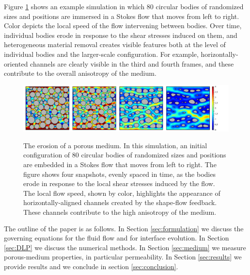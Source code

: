 \documentclass[3p]{elsarticle}
\begin{document}
	Figure \ref{fig1} shows an example simulation in which 80 circular bodies of randomized sizes and positions are immersed in a Stokes flow that moves from left to right. Color depicts the local speed of the flow intervening between bodies. Over time, individual bodies erode in response to the shear stresses induced on them, and heterogeneous material removal creates visible features both at the level of individual bodies and the larger-scale configuration. For example, horizontally-oriented channels are clearly visible in the third and fourth frames, and these contribute to the overall anisotropy of the medium.



\begin{figure}%
\centering \label{fig1}
\includegraphics[width = 0.99 \textwidth]{./figs/Velocity-80-4.pdf}
\caption{The erosion of a porous medium. In this simulation, an initial configuration of 80 circular bodies of randomized sizes and positions are embedded in a Stokes flow that moves from left to right. The figure shows four snapshots, evenly spaced in time, as the bodies erode in response to the local shear stresses induced by the flow. The local flow speed, shown by color, highlights the appearance of horizontally-aligned channels created by the shape-flow feedback. These channels contribute to the high anisotropy of the medium.
}
\end{figure}

The outline of the paper is as follows. In Section \ref{sec:formulation} we discuss the governing equations for the fluid flow and for interface evolution. In Section \ref{sec:DLP} we discuss the numerical methods. In Section \ref{sec:medium} we measure porous-medium properties, in particular permeability.
In Section \ref{sec:results} we provide results and we conclude in section \ref{sec:conclusion}.
\end{document}
